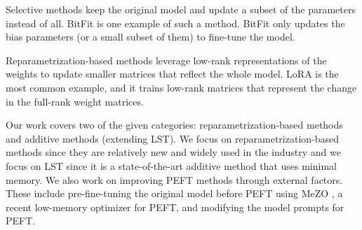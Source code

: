 Selective methods keep the original model and update a subset of the parameters instead of all. BitFit \cite{zaken2022bitfit} is one example of such a method. BitFit only updates the bias parameters (or a small subset of them) to fine-tune the model.

Reparametrization-based methods leverage low-rank representations of the weights to update smaller matrices that reflect the whole model. LoRA \cite{hu2021lora} is the most common example, and it trains low-rank matrices that represent the change in the full-rank weight matrices.

Our work covers two of the given categories: reparametrization-based methods and additive methods (extending LST). We focus on reparametrization-based methods since they are relatively new and widely used in the industry and we focus on LST since it is a state-of-the-art additive method that uses minimal memory. We also work on improving PEFT methods through external factors. These include pre-fine-tuning the original model before PEFT using MeZO \cite{mezo}, a recent low-memory optimizer for PEFT, and modifying the model prompts for PEFT.